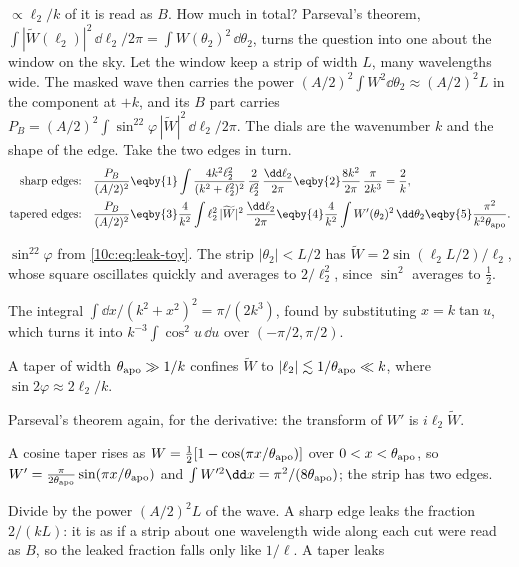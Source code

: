 $\propto\ell_2/k$ of it is read as $B$. How much in total? Parseval's theorem, $\int|\widetilde W(\ell_2)|^2\,\dd\ell_2/2\pi=\int
W(\theta_2)^2\,\dd\theta_2$, turns the question into one about the window on the sky. Let the window keep a strip of
width $L$, many wavelengths wide. The masked wave then carries the power $(A/2)^2\int W^2\dd\theta_2\approx(A/2)^2L$ in
the component at $+k$, and its $B$ part carries $P_B=(A/2)^2\int\sin^22\varphi\,|\widetilde W|^2\,\dd\ell_2/2\pi$. The dials
are the wavenumber $k$ and the shape of the edge. Take the two edges in turn.
\begin{align}
  \text{sharp edges:}\quad
  \frac{P_B}{(A/2)^2}
  &\eqby{1}\int\frac{4k^2\ell_2^2}{(k^2+\ell_2^2)^2}\,\frac{2}{\ell_2^2}\,\frac{\dd\ell_2}{2\pi}
   \eqby{2}\frac{8k^2}{2\pi}\,\frac{\pi}{2k^3}=\frac2k ,
  \nonumber\\
  \text{tapered edges:}\quad
  \frac{P_B}{(A/2)^2}
  &\eqby{3}\frac{4}{k^2}\int\ell_2^2\,|\widetilde W|^2\,\frac{\dd\ell_2}{2\pi}
   \eqby{4}\frac{4}{k^2}\int W'(\theta_2)^2\,\dd\theta_2
   \eqby{5}\frac{\pi^2}{k^2\theta_{\rm apo}} .
  \label{10c:eq:leak-size}
\end{align}
\begin{explain}
  \item $\sin^22\varphi$ from \eqref{10c:eq:leak-toy}. The strip $|\theta_2|<L/2$ has $\widetilde W=2\sin(\ell_2L/2)/\ell_2$, whose
        square oscillates quickly and averages to $2/\ell_2^2$, since $\sin^2$ averages to $\frac12$.
  \item The integral $\int\dd x/(k^2+x^2)^2=\pi/(2k^3)$, found by substituting $x=k\tan u$, which turns it into
        $k^{-3}\int\cos^2u\,\dd u$ over $(-\pi/2,\pi/2)$.
  \item A taper of width $\theta_{\rm apo}\gg1/k$ confines $\widetilde W$ to $|\ell_2|\lesssim1/\theta_{\rm apo}\ll k$, where
        $\sin2\varphi\approx2\ell_2/k$.
  \item Parseval's theorem again, for the derivative: the transform of $W'$ is $i\ell_2\widetilde W$.
  \item A cosine taper rises as $W=\frac12[1-\cos(\pi x/\theta_{\rm apo})]$ over $0<x<\theta_{\rm apo}$, so
        $W'=\frac{\pi}{2\theta_{\rm apo}}\sin(\pi x/\theta_{\rm apo})$ and $\int W'^2\dd x=\pi^2/(8\theta_{\rm apo})$; the strip has two edges.
\end{explain}
Divide by the power $(A/2)^2L$ of the wave. A sharp edge leaks the fraction $2/(kL)$: it is as if a strip about one
wavelength wide along each cut were read as $B$, so the leaked fraction falls only like $1/\ell$. A taper leaks
